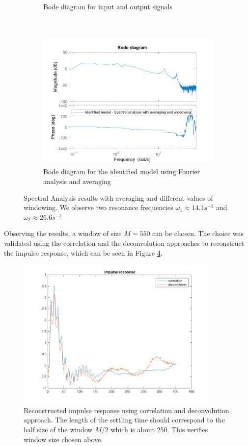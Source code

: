 \documentclass[a4paper,11pt]{article}
\begin{document}
\begin{figure}[H]
\begin{subfigure}[t]{0.45\textwidth}
  \caption{Bode diagram for input and output signals}
  \label{fig:bode_sa_m650}
\end{subfigure}
~\qquad \qquad
\begin{subfigure}[t]{0.45\textwidth}
  \centering
  \includegraphics[height = 7cm]{images/1_Spectral_analysis_m2046}
  \caption{Bode diagram for the identified model using Fourier analysis and averaging}
  \label{fig:bode_sa_m2046}
\end{subfigure}

\caption{Spectral Analysis results with averaging and different values of windowing. We observe two resonance frequencies $\omega_1 \approx 14.1 s^{-1} $ and $\omega_2 \approx 26.6 s^{-1}$}
\label{fig:SA}
\end{figure}

Observing the results, a window of size $M = 550$ can be chosen. The choice was validated using the correlation and the deconvolution approaches to reconstruct the impulse response, which can be seen in Figure \ref{fig:impulse_resp}.


\begin{figure}[H]
\centering
\includegraphics[width = 10cm]{images/1_impulse_response}
\caption{Reconstructed impulse response using correlation and deconvolution approach. The length of the settling time should correspond to the half size of the window $M/2$ which is about 250. This verifies window size chosen above.}
\label{fig:impulse_resp}
\end{figure}
\end{document}
